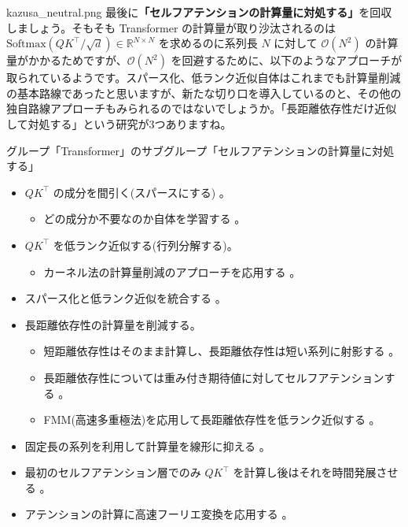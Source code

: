\documentclass[b5paper,xelatex,ja=standard,10pt]{bxjsarticle}
\begin{document}
\begin{SERIFU}[colback=PaleIris, colbacktitle=PaleIris2]{kazusa_neutral.png}
最後に\textbf{「セルフアテンションの計算量に対処する」}を回収しましょう。そもそも Transformer の計算量が取り沙汰されるのは $\mathrm{Softmax} \left( Q K ^\top / \sqrt{d} \right) \in \mathbb{R}^{N \times N}$ を求めるのに系列長 $N$ に対して $\mathcal{O}(N^2)$ の計算量がかかるためですが、$\mathcal{O}(N^2)$ を回避するために、以下のようなアプローチが取られているようです。スパース化、低ランク近似自体はこれまでも計算量削減の基本路線であったと思いますが、新たな切り口を導入しているのと、その他の独自路線アプローチもみられるのではないでしょうか。「長距離依存性だけ近似して対処する」という研究が3つありますね。
\end{SERIFU}

\vspace{1pt}
\begin{PROP2}[left=0pt]{グループ「Transformer」のサブグループ「セルフアテンションの計算量に対処する」}
\begin{itemize}
  \item $Q K ^\top$ の成分を間引く(スパースにする) 。
  \begin{itemize}
    \item どの成分か不要なのか自体を学習する \cite{SebastianJaszczur2021}。
  \end{itemize}
  \vspace{6pt}
  \item $Q K ^\top$ を低ランク近似する(行列分解する)。
  \begin{itemize}
    \item カーネル法の計算量削減のアプローチを応用する \cite{YifanChen2021}。
  \end{itemize}
  \vspace{6pt}
  \item スパース化と低ランク近似を統合する \cite{BeidiChen2021}。
  \vspace{6pt}
  \item 長距離依存性の計算量を削減する。
  \begin{itemize}
    \item 短距離依存性はそのまま計算し、長距離依存性は短い系列に射影する \cite{ChenZhu2021}。
    \item 長距離依存性については重み付き期待値に対してセルフアテンションする \cite{HongyuRen2021}。
    \item FMM(高速多重極法)を応用して長距離依存性を低ランク近似する \cite{TanNguyen2021}。
  \end{itemize}
  \vspace{6pt}
  \item 固定長の系列を利用して計算量を線形に抑える \cite{XuezheMa2021}。
  \vspace{6pt}
  \item 最初のセルフアテンション層でのみ $Q K ^\top$ を計算し後はそれを時間発展させる \cite{SubhabrataDutta2021}。
  \vspace{6pt}
  \item アテンションの計算に高速フーリエ変換を応用する \cite{ShengjieLuo2021}。
\end{itemize}
\end{PROP2}
\end{document}
